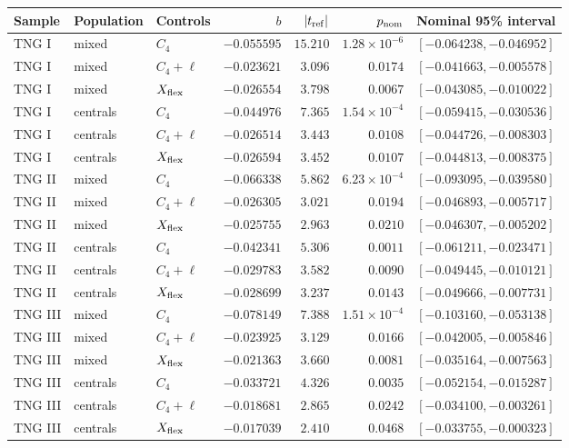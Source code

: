 \begin{tabular}{lllrrrl}
\toprule
Sample & Population & Controls & $b$ & $|t_{\rm ref}|$ & $p_{\rm nom}$ & Nominal 95\% interval \\
\midrule
TNG I & mixed & $C_4$ & $-0.055595$ & $15.210$ & $1.28\times10^{-6}$ & $[-0.064238, -0.046952]$ \\
TNG I & mixed & $C_4+\ell$ & $-0.023621$ & $3.096$ & $0.0174$ & $[-0.041663, -0.005578]$ \\
TNG I & mixed & $X_{\rm flex}$ & $-0.026554$ & $3.798$ & $0.0067$ & $[-0.043085, -0.010022]$ \\
TNG I & centrals & $C_4$ & $-0.044976$ & $7.365$ & $1.54\times10^{-4}$ & $[-0.059415, -0.030536]$ \\
TNG I & centrals & $C_4+\ell$ & $-0.026514$ & $3.443$ & $0.0108$ & $[-0.044726, -0.008303]$ \\
TNG I & centrals & $X_{\rm flex}$ & $-0.026594$ & $3.452$ & $0.0107$ & $[-0.044813, -0.008375]$ \\
TNG II & mixed & $C_4$ & $-0.066338$ & $5.862$ & $6.23\times10^{-4}$ & $[-0.093095, -0.039580]$ \\
TNG II & mixed & $C_4+\ell$ & $-0.026305$ & $3.021$ & $0.0194$ & $[-0.046893, -0.005717]$ \\
TNG II & mixed & $X_{\rm flex}$ & $-0.025755$ & $2.963$ & $0.0210$ & $[-0.046307, -0.005202]$ \\
TNG II & centrals & $C_4$ & $-0.042341$ & $5.306$ & $0.0011$ & $[-0.061211, -0.023471]$ \\
TNG II & centrals & $C_4+\ell$ & $-0.029783$ & $3.582$ & $0.0090$ & $[-0.049445, -0.010121]$ \\
TNG II & centrals & $X_{\rm flex}$ & $-0.028699$ & $3.237$ & $0.0143$ & $[-0.049666, -0.007731]$ \\
TNG III & mixed & $C_4$ & $-0.078149$ & $7.388$ & $1.51\times10^{-4}$ & $[-0.103160, -0.053138]$ \\
TNG III & mixed & $C_4+\ell$ & $-0.023925$ & $3.129$ & $0.0166$ & $[-0.042005, -0.005846]$ \\
TNG III & mixed & $X_{\rm flex}$ & $-0.021363$ & $3.660$ & $0.0081$ & $[-0.035164, -0.007563]$ \\
TNG III & centrals & $C_4$ & $-0.033721$ & $4.326$ & $0.0035$ & $[-0.052154, -0.015287]$ \\
TNG III & centrals & $C_4+\ell$ & $-0.018681$ & $2.865$ & $0.0242$ & $[-0.034100, -0.003261]$ \\
TNG III & centrals & $X_{\rm flex}$ & $-0.017039$ & $2.410$ & $0.0468$ & $[-0.033755, -0.000323]$ \\

\end{tabular}
